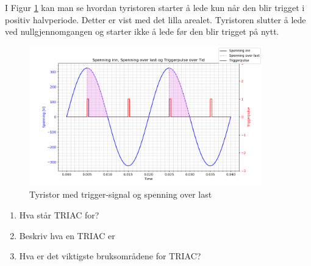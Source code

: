 \begin{solution}[name=Løsningsforslag]
I Figur \ref{fig:tyrTriggplotSOL} kan man se hvordan tyristoren starter å lede kun når den blir trigget i positiv halvperiode. Detter er vist med det lilla arealet. Tyristoren slutter å lede ved nullgjennomgangen og starter ikke å lede før den blir trigget på nytt.

\begin{figure}[H]
	\centering
	\includegraphics[width=0.9\textwidth]{tyristor/plot/tyristor3SOL.png}
	\caption{Tyristor med trigger-signal og spenning over last}
	\label{fig:tyrTriggplotSOL}
\end{figure}

\end{solution}





\begin{question}[name=Spørsmål, topic=tyristor]


	\begin{enumerate}[label=\roman*)]
		\item Hva står TRIAC for?
		\item Beskriv hva en TRIAC er
		\item Hva er det viktigste bruksområdene for TRIAC?

	\end{enumerate}
\end{question}



\vspace{0.5cm} %

